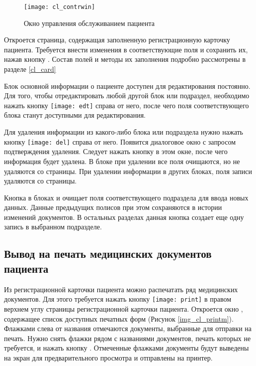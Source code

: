 \begin{figure}[ht]\centering
 \texttt{[image: cl\_contrwin]}
 \caption{Окно управления обслуживанием пациента}
 \label{img_cl_contrwin}
\end{figure} 

Откроется страница, содержащая заполненную регистрационную карточку пациента. Требуется внести изменения в соответствующие поля и сохранить их, нажав кнопку . Состав полей и методы их заполнения подробно рассмотрены в разделе \ref{cl_card}

Блок основной информации о пациенте доступен для редактирования постоянно. Для того, чтобы отредактировать любой другой блок или подраздел, необходимо нажать кнопку \texttt{[image: edt]} справа от него, после чего поля соответствующего блока станут доступными для редактирования.

Для удаления информации из какого-либо блока или подраздела нужно нажать кнопку \texttt{[image: del]} справа от  него. Появится диалоговое окно с запросом подтверждения удаления. Следует нажать кнопку  в этом окне, после чего информация будет удалена. В блоке  при удалении все поля очищаются, но не удаляются со страницы. При удалении информации в других блоках, поля записи удаляются со страницы.

Кнопка  в блоках  и  очищает поля соответствующего подраздела для ввода новых данных. Данные предыдущих полисов при этом сохраняются в истории изменений документов. В остальных разделах данная кнопка создает еще одну запись в выбранном подразделе.

\subsection{Вывод на печать медицинских документов пациента}

Из регистрационной карточки пациента можно распечатать ряд медицинских документов. Для этого требуется нажать кнопку \texttt{[image: print]} в правом верхнем углу страницы регистрационной карточки пациента. Откроется окно , содержащее список доступных печатных форм (Рисунок \ref{img_cl_printm}). Флажками слева от названия отмечаются документы, выбранные для отправки на печать. Нужно снять флажки рядом с названиями документов, печать которых не требуется, и нажать кнопку . Отмеченные флажками документы будут выведены на экран для предварительного просмотра и отправлены на принтер.

